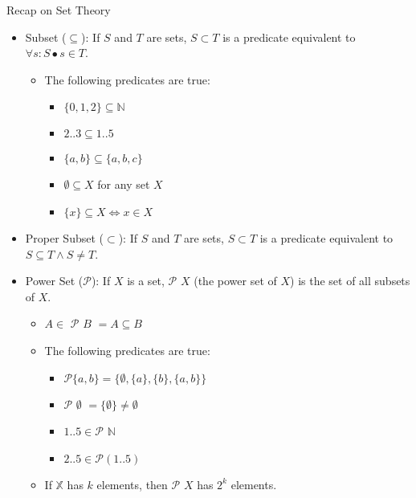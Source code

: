 \documentclass[aspectratio=169]{beamer}
\begin{document}
\begin{frame}{Recap on Set Theory}
    \begin{itemize}
        \item Subset ($\subseteq$): If $S$ and $T$ are sets, $S \subset T$ is a predicate equivalent to $\forall s : S \bullet s \in T$.
        \begin{itemize}
            \item The following predicates are true:
            \begin{itemize}
                \item $\{0, 1, 2\} \subseteq \mathbb{N}$
                \item $2..3 \subseteq 1..5$
                \item $\{a, b\} \subseteq \{a, b, c\}$
                \item $\emptyset \subseteq X$ for any set $X$
                \item $\{x\} \subseteq X \Leftrightarrow x \in X$
            \end{itemize}
        \end{itemize}
        \item Proper Subset ($\subset$): If $S$ and $T$ are sets, $S \subset T$ is a predicate equivalent to $S \subseteq T \wedge S \neq T$.
        \item Power Set ($\mathcal{P}$): If $X$ is a set, $\mathcal{P}$ $X$ (the power set of $X$) is the set of all subsets of $X$.
        \begin{itemize}
            \item $A \in$ $\mathcal{P}$ $B$ $= A \subseteq B$ 
            \item The following predicates are true:
            \begin{itemize}
                \item $\mathcal{P}\{a, b\} = \{\emptyset, \{a\}, \{b\}, \{a, b\}\}$
                \item $\mathcal{P}$ $\emptyset$ $= \{\emptyset\} \neq \emptyset$
                \item $1 .. 5 \in \mathcal{P}$ $\mathbb{N}$
                \item $2 .. 5 \in \mathcal{P}(1 .. 5)$
            \end{itemize}
            \item If $\mathbb{X}$ has $k$ elements, then $\mathcal{P}$ $X$ has $2^{k}$ elements.
        \end{itemize}
    \end{itemize}
\end{frame}
\end{document}
